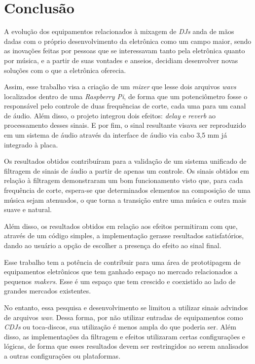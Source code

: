 \chapter[Conclusão]{Conclusão}

A evolução dos equipamentos relacionados à mixagem de \textit{DJs} anda de mãos dadas com o próprio desenvolvimento da eletrônica como um campo maior, sendo as inovações feitas por pessoas que se interessavam tanto pela eletrônica quanto por música, e a partir de suas vontades e anseios, decidiam desenvolver novas soluções com o que a eletrônica oferecia.

Assim, esse trabalho visa a criação de um \textit{mixer} que lesse dois arquivos \textit{wavs} localizados dentro de uma \textit{Raspberry Pi}, de forma que um potenciômetro fosse o responsável pelo controle de duas frequências de corte, cada uma para um canal de áudio. Além disso, o projeto integrou dois efeitos: \textit{delay} e \textit{reverb} ao processamento desses sinais. E por fim, o sinal resultante visava ser reproduzido em um sistema de áudio através da interface de áudio via cabo 3,5 mm já integrado à placa.

Os resultados obtidos contribuíram para a validação de um sistema unificado de filtragem de sinais de áudio a partir de apenas um controle. Os sinais obtidos em relação à filtragem demonstraram um bom funcionamento visto que, para cada frequência de corte, espera-se que determinados elementos na composição de uma música sejam atenuados, o que torna a transição entre uma música e outra mais suave e natural.

Além disso, os resultados obtidos em relação aos efeitos permitiram com que, através de um código simples, a implementação gerasse resultados satisfatórios, dando ao usuário a opção de escolher a presença do efeito ao sinal final. 

Esse trabalho tem a potência de contribuir para uma área de prototipagem de equipamentos eletrônicos que tem ganhado espaço no mercado relacionados a pequenos \textit{makers}. Esse é um espaço que tem crescido e coexistido ao lado de grandes mercados existentes.

No entanto, essa pesquisa e desenvolvimento se limitou a utilizar sinais advindos de arquivos \textit{wav}. Dessa forma, por não utilizar entradas de equipamentos como \textit{CDJs} ou toca-discos, sua utilização é menos ampla do que poderia ser. Além disso, as implementações da filtragem e efeitos utilizaram certas configurações e lógicas, de forma que esses resultados devem ser restringidos ao serem analisados a outras configurações ou plataformas.


